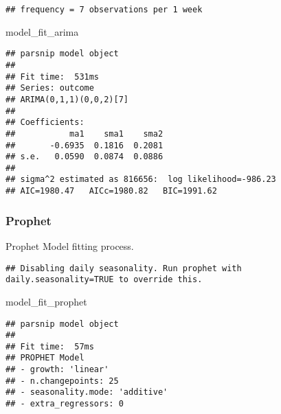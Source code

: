 \documentclass[
]{article}
\newenvironment{Shaded}{\begin{snugshade}}{\end{snugshade}}
\newcommand{\DataTypeTok}[1]{\textcolor[rgb]{0.13,0.29,0.53}{#1}}
\newcommand{\KeywordTok}[1]{\textcolor[rgb]{0.13,0.29,0.53}{\textbf{#1}}}
\newcommand{\NormalTok}[1]{#1}
\newcommand{\OperatorTok}[1]{\textcolor[rgb]{0.81,0.36,0.00}{\textbf{#1}}}
\newcommand{\OtherTok}[1]{\textcolor[rgb]{0.56,0.35,0.01}{#1}}
\newcommand{\StringTok}[1]{\textcolor[rgb]{0.31,0.60,0.02}{#1}}
\begin{document}
\begin{verbatim}
## frequency = 7 observations per 1 week
\end{verbatim}

\begin{Shaded}
\begin{Highlighting}[]
\NormalTok{model_fit_arima}
\end{Highlighting}
\end{Shaded}

\begin{verbatim}
## parsnip model object
## 
## Fit time:  531ms 
## Series: outcome 
## ARIMA(0,1,1)(0,0,2)[7] 
## 
## Coefficients:
##           ma1    sma1    sma2
##       -0.6935  0.1816  0.2081
## s.e.   0.0590  0.0874  0.0886
## 
## sigma^2 estimated as 816656:  log likelihood=-986.23
## AIC=1980.47   AICc=1980.82   BIC=1991.62
\end{verbatim}

\hypertarget{prophet-1}{%
\subsubsection{Prophet}\label{prophet-1}}

Prophet Model fitting process.

\begin{Shaded}
\end{Shaded}

\begin{verbatim}
## Disabling daily seasonality. Run prophet with daily.seasonality=TRUE to override this.
\end{verbatim}

\begin{Shaded}
\begin{Highlighting}[]
\NormalTok{model_fit_prophet}
\end{Highlighting}
\end{Shaded}

\begin{verbatim}
## parsnip model object
## 
## Fit time:  57ms 
## PROPHET Model
## - growth: 'linear'
## - n.changepoints: 25
## - seasonality.mode: 'additive'
## - extra_regressors: 0
\end{verbatim}
\end{document}
